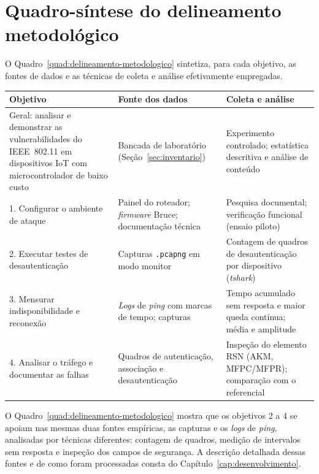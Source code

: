 \section{Quadro-síntese do delineamento metodológico}

O Quadro~\ref{quad:delineamento-metodologico} sintetiza, para cada objetivo, as fontes de dados e as técnicas de coleta e análise efetivamente empregadas.

\begin{quadro}[!htbp]
    \centering
    \caption{Delineamento metodológico por objetivo}
    \label{quad:delineamento-metodologico}
    \small
    \renewcommand{\arraystretch}{1.15}
    \begin{tabular}{|p{}|p{}|p{}|}
        \hline
        \textbf{Objetivo} & \textbf{Fonte dos dados} & \textbf{Coleta e análise} \\ \hline
        Geral: analisar e demonstrar as vulnerabilidades do IEEE~802.11 em dispositivos IoT com microcontrolador de baixo custo & Bancada de laboratório (Seção~\ref{sec:inventario}) & Experimento controlado; estatística descritiva e análise de conteúdo \\ \hline
        1. Configurar o ambiente de ataque & Painel do roteador; \textit{firmware} Bruce; documentação técnica & Pesquisa documental; verificação funcional (ensaio piloto) \\ \hline
        2. Executar testes de desautenticação & Capturas \texttt{.pcapng} em modo monitor & Contagem de quadros de desautenticação por dispositivo (\textit{tshark}) \\ \hline
        3. Mensurar indisponibilidade e reconexão & \textit{Logs} de \textit{ping} com marcas de tempo; capturas & Tempo acumulado sem resposta e maior queda contínua; média e amplitude \\ \hline
        4. Analisar o tráfego e documentar as falhas & Quadros de autenticação, associação e desautenticação & Inspeção do elemento RSN (AKM, MFPC/MFPR); comparação com o referencial \\ \hline
    \end{tabular}
\end{quadro}

O Quadro~\ref{quad:delineamento-metodologico} mostra que os objetivos 2 a 4 se apoiam nas mesmas duas fontes empíricas, as capturas e os \textit{logs} de \textit{ping}, analisadas por técnicas diferentes: contagem de quadros, medição de intervalos sem resposta e inspeção dos campos de segurança. A descrição detalhada dessas fontes e de como foram processadas consta do Capítulo~\ref{cap:desenvolvimento}.
